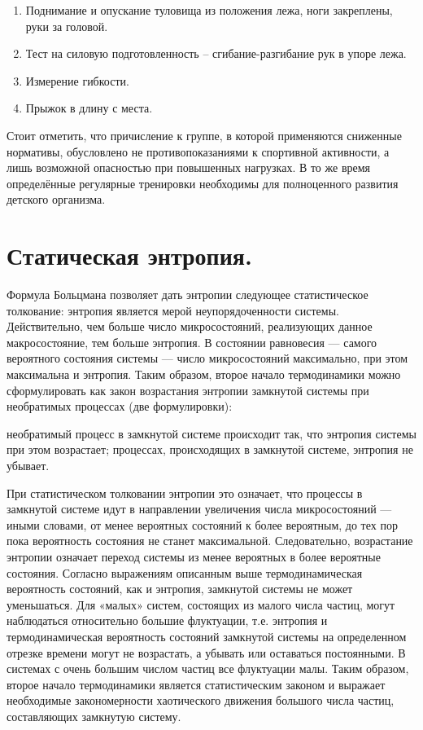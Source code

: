 \documentclass[bachelor, och, referat ]{SCWorks}
\begin{document}
\begin{enumerate}
\item{Поднимание и опускание туловища из положения лежа, ноги закреплены, руки за головой.}
\item{Тест на силовую подготовленность – сгибание-разгибание рук в упоре лежа.}
\item{Измерение гибкости.}
\item{Прыжок в длину с места.}
\end{enumerate}
Стоит отметить, что причисление к группе, в которой применяются сниженные нормативы, обусловлено не противопоказаниями к спортивной активности, а лишь возможной опасностью при повышенных нагрузках. В то же время определённые регулярные тренировки необходимы для полноценного развития детского организма. 
\newpage

\section{Статическая энтропия.}
Формула Больцмана позволяет дать энтропии следующее статистическое толкование: энтропия является мерой неупорядоченности системы.
Действительно, чем больше число микросостояний, реализующих данное макросостояние, тем больше энтропия. В состоянии равновесия — самого вероятного состояния системы — число микросостояний максимально, при этом максимальна и энтропия.
Таким образом, второе начало термодинамики можно сформулировать как закон возрастания энтропии замкнутой системы при необратимых процессах (две формулировки):
\begin{itemize}
 необратимый процесс в замкнутой системе происходит так, что энтропия системы при этом возрастает;
 процессах, происходящих в замкнутой системе, энтропия не убывает.
\end{itemize}
При статистическом толковании энтропии это означает, что процессы в замкнутой системе идут в направлении увеличения числа микросостояний — иными словами, от менее вероятных состояний к более вероятным, до тех пор пока вероятность состояния не станет максимальной. Следовательно, возрастание энтропии означает переход системы из менее вероятных в более вероятные состояния. Согласно выражениям описанным выше термодинамическая вероятность состояний, как и энтропия, замкнутой системы не может уменьшаться.
Для «малых» систем, состоящих из малого числа частиц, могут наблюдаться относительно большие флуктуации, т.е. энтропия и термодинамическая вероятность состояний замкнутой системы на определенном отрезке времени могут не возрастать, а убывать или оставаться постоянными. В системах с очень большим числом частиц все флуктуации малы.
Таким образом, второе начало термодинамики является статистическим законом и выражает необходимые закономерности хаотического движения большого числа частиц, составляющих замкнутую систему.
\end{document}
